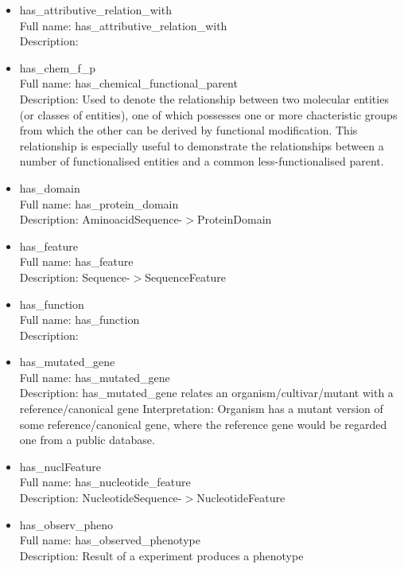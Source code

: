 \begin{itemize}
\item{has\_attributive\_relation\_with}\\ Full name: has\_attributive\_relation\_with\\ Description: 

\item{has\_chem\_f\_p}\\ Full name: has\_chemical\_functional\_parent\\ Description: Used to denote the relationship between two molecular entities (or classes of entities), one of which possesses one or more chacteristic groups from which the other can be derived by functional modification. This relationship is especially useful to demonstrate the relationships between a number of functionalised entities and a common less-functionalised parent. 

\item{has\_domain}\\ Full name: has\_protein\_domain\\ Description: AminoacidSequence-$>$ProteinDomain 

\item{has\_feature}\\ Full name: has\_feature\\ Description: Sequence-$>$SequenceFeature 

\item{has\_function}\\ Full name: has\_function\\ Description: 

\item{has\_mutated\_gene}\\ Full name: has\_mutated\_gene\\ Description: has\_mutated\_gene relates an organism/cultivar/mutant with a reference/canonical gene Interpretation: Organism has a mutant version of some reference/canonical gene, where the reference gene would be regarded one from a public database. 

\item{has\_nuclFeature}\\ Full name: has\_nucleotide\_feature\\ Description: NucleotideSequence-$>$NucleotideFeature 

\item{has\_observ\_pheno}\\ Full name: has\_observed\_phenotype\\ Description: Result of a experiment produces a phenotype 


\end{itemize}
